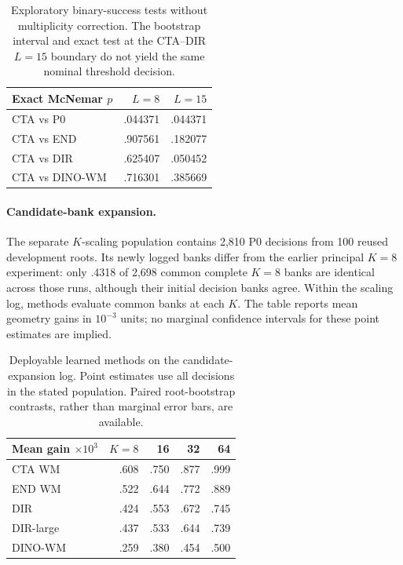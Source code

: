 \documentclass[10pt,twocolumn,letterpaper]{article}
\begin{document}
\begin{table}[t]
\centering\small
\begin{tabular}{lrr}
\toprule
Exact McNemar $p$ & $L=8$ & $L=15$ \\
\midrule
CTA vs P0 & .044371 & .044371 \\
CTA vs END & .907561 & .182077 \\
CTA vs DIR & .625407 & .050452 \\
CTA vs DINO-WM & .716301 & .385669 \\
\bottomrule
\end{tabular}
\caption{Exploratory binary-success tests without multiplicity correction. The bootstrap interval and exact test at the CTA--DIR $L=15$ boundary do not yield the same nominal threshold decision.}
\end{table}

\paragraph{Candidate-bank expansion.}
The separate $K$-scaling population contains 2,810 P0 decisions from 100 reused development roots. Its newly logged banks differ from the earlier principal $K=8$ experiment: only .4318 of 2,698 common complete $K=8$ banks are identical across those runs, although their initial decision banks agree. Within the scaling log, methods evaluate common banks at each $K$. The table reports mean geometry gains in $10^{-3}$ units; no marginal confidence intervals for these point estimates are implied.

\begin{table}[t]
\centering\small
\begin{tabular}{lrrrr}
\toprule
Mean gain $\times10^3$ & $K=8$ & 16 & 32 & 64 \\
\midrule
CTA WM & .608 & .750 & .877 & .999 \\
END WM & .522 & .644 & .772 & .889 \\
DIR & .424 & .553 & .672 & .745 \\
DIR-large & .437 & .533 & .644 & .739 \\
DINO-WM & .259 & .380 & .454 & .500 \\
\bottomrule
\end{tabular}
\caption{Deployable learned methods on the candidate-expansion log. Point estimates use all decisions in the stated population. Paired root-bootstrap contrasts, rather than marginal error bars, are available.}
\end{table}
\end{document}
